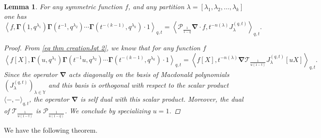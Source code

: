 \documentclass[12pt]{amsart}
\newtheorem{lem}[thm]{Lemma}
\theoremstyle{remark}
\newcommand{\J}{{J}^{(q,t)}}
\newcommand{\nablaJ}{\boldsymbol{\nabla}}
\newcommand{\GammaJ}{\boldsymbol{\Gamma}}
\newcommand{\Pop}{\mathcal{P}}
\newcommand{\Top}{\mathcal{T}}
\begin{document}
\begin{lem}\label{lem GammaJ-scalar J}
    For any symmetric function $f$, and any partition $\lambda=[\lambda_1,\lambda_2,\dots,\lambda_k]$ one has
$$\left\langle f,\GammaJ(1,q^{\lambda_1})\GammaJ(t^{-1},q^{\lambda_2})\cdots \GammaJ(t^{-(k-1)},q^{\lambda_{k}}) \cdot 1\right\rangle_{q,t}=\left\langle\Pop_{\frac{1}{1-q}}\nablaJ\cdot f,t^{-n(\lambda)}\J_\lambda\right\rangle _{q,t}.$$
\begin{proof}
    From \cref{eq thm creationJqt 2}, we know that for any function $f$
    $$\left\langle f[X], \GammaJ(u,q^{\lambda_1})\GammaJ(t^{-1}u,q^{\lambda_2}) \cdots \GammaJ(t^{-(k-1)},q^{\lambda_{k}}) \cdot 1\right\rangle_{q,t} 
    =\left\langle f[X],t^{-n(\lambda)}\nablaJ \Top_{\frac{1}{u(1-t)}} \J_\lambda[uX]\right\rangle_{q,t}.$$
Since the operator $\nablaJ$ acts diagonally on the basis of Macdonald polynomials $(\J_\lambda)_{\lambda\in\mathbb Y}$ and this basis is orthogonal with respect to the scalar product $\langle-,-\rangle_{q,t}$, the operator $\nablaJ$ is self dual with this scalar product. Moreover, the dual of $\Top_{\frac{1}{u(1-t)}}$ is $\Pop_{\frac{1}{u(1-q)}}$. We conclude by specializing $u=1$.
\end{proof}
\end{lem}


We have the following theorem.
\end{document}
